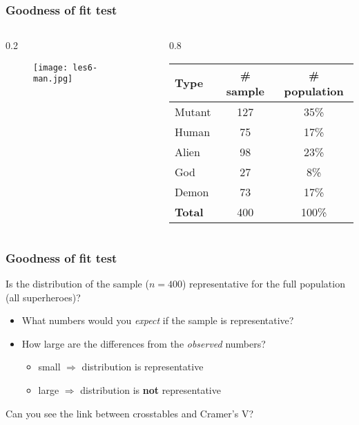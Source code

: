 \documentclass[aspectratio=169]{beamer}
\begin{document}
\begin{frame}
  \frametitle{Goodness of fit test}
  \begin{columns}
    \begin{column} {0.2 \textwidth}
      
      \begin{figure}
        \centering
        \texttt{[image: les6-man.jpg]}
      \end{figure}
      
    \end{column}
    
    \begin{column} { 0.8 \textwidth}
      \begin{table}[h]
        \begin{tabular}{@{}lcc@{}}
          \toprule
          \textbf{Type}   & \textbf{\# sample}     & \textbf{\# population} \\ \midrule
          Mutant          &          127           &         35\%           \\
          Human           &           75           &         17\%           \\
          Alien           &           98           &         23\%           \\
          God             &           27           &          8\%           \\
          Demon           &           73           &         17\%           \\ \midrule
          \textbf{Total}  &          400           &         100\%          \\
        \end{tabular}
      \end{table}
    \end{column}
  \end{columns}
\end{frame}

\begin{frame}
  \frametitle{Goodness of fit test}
  Is the distribution of the sample ($n = 400$) representative for the full population (all superheroes)?
  
  \begin{itemize}
    \item What numbers would you \textit{expect} if the sample is representative?
    \item How large are the differences from the \textit{observed} numbers?
    \begin{itemize}
      \item small $\Rightarrow$ distribution is representative
      \item large $\Rightarrow$ distribution is \textbf{not} representative
    \end{itemize}
  \end{itemize}
  
  \pause
  Can you see the link between crosstables and Cramer's V?
\end{frame}
\end{document}
